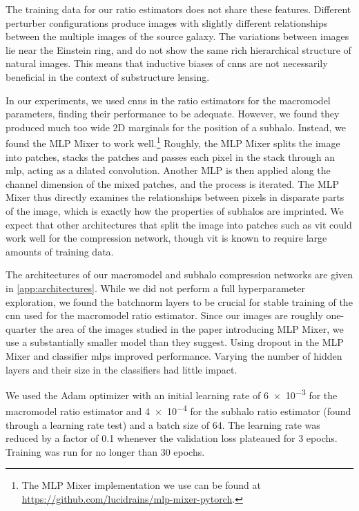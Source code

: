 The training data for our ratio estimators does not share these features. Different perturber configurations produce images with slightly different relationships between the multiple images of the source galaxy. The variations between images lie near the Einstein ring, and do not show the same rich hierarchical structure of natural images. This means that inductive biases of \gls*{cnn}s are not necessarily beneficial in the context of substructure lensing.

In our experiments, we used \gls*{cnn}s in the ratio estimators for the macromodel parameters, finding their performance to be adequate. However, we found they produced much too wide 2D marginals for the position of a subhalo. Instead, we found the MLP Mixer \citep{Tolstikhin:2021aa} to work well.\footnote{
    The MLP Mixer implementation we use can be found at \url{https://github.com/lucidrains/mlp-mixer-pytorch}.
} Roughly, the MLP Mixer splits the image into patches, stacks the patches and passes each pixel in the stack through an \gls*{mlp}, acting as a dilated convolution. Another MLP is then applied along the channel dimension of the mixed patches, and the process is iterated. The MLP Mixer thus directly examines the relationships between pixels in disparate parts of the image, which is exactly how the properties of subhalos are imprinted. We expect that other architectures that split the image into patches such as \gls*{vit} \citep{Dosovitskiy:2020qjv} could work well for the compression network, though \gls*{vit} is known to require large amounts of training data.

The architectures of our macromodel and subhalo compression networks are given in \autoref{app:architectures}. While we did not perform a full hyperparameter exploration, we found the batchnorm layers to be crucial for stable training of the \gls*{cnn} used for the macromodel ratio estimator. Since our images are roughly one-quarter the area of the images studied in the paper introducing MLP Mixer, we use a substantially smaller model than they suggest. Using dropout in the MLP Mixer and classifier \gls*{mlp}s improved performance. Varying the number of hidden layers and their size in the classifiers had little impact.

We used the Adam optimizer with an initial learning rate of \num{6e-3} for the macromodel ratio estimator and \num{4e-4} for the subhalo ratio estimator (found through a learning rate test) and a batch size of \num{64}. The learning rate was reduced by a factor of \num{0.1} whenever the validation loss plateaued for \num{3} epochs. Training was run for no longer than \num{30} epochs.

